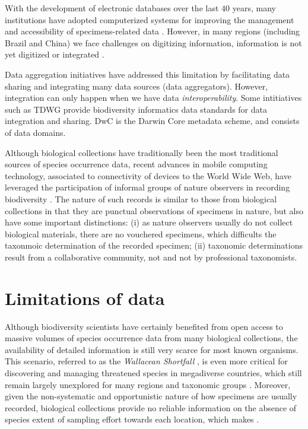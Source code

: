 With the development of electronic databases over the last $40$ years, many institutions have adopted computerized systems for improving the management and accessibility of specimens-related data \cite{Sunderland2013}.
However, in many regions (including Brazil and China) we face challenges on digitizing information, information is not yet digitized or integrated \cite{Meyer2016}.




Data aggregation initiatives have addressed this limitation by facilitating data sharing and integrating many data sources (data aggregators). %
However, integration can only happen when we have data \textit{interoperability}.
Some intitiatives such as TDWG provide biodiversity informatics data standards for data integration and sharing.
DwC is the Darwin Core metadata scheme, and consists of data domains. %


Although biological collections have traditionally been the most traditional sources of species occurrence data, recent advances in mobile computing technology, associated to connectivity of devices to the World Wide Web, have leveraged the participation of informal groups of nature observers in recording biodiversity \cite{Silvertown2009}.
The nature of such records is similar to those from biological collections in that they are punctual observations of specimens in nature, but also have some important distinctions: (i) as nature observers usually do not collect biological materials, there are no vouchered specimens, which difficults the taxonmoic determination of the recorded specimen; (ii) taxonomic determinations result from a collaborative community, not and not by professional taxonomists. 





\section{Limitations of data}

Although biodiversity scientists have certainly benefited from open access to massive volumes of species occurrence data from many biological collections, the availability of detailed information is still very scarce for most known organisms.
This scenario, referred to as the \textit{Wallacean Shortfall} \cite{Lomolino2004}, is even more critical for discovering and managing threatened species in megadiverse countries, which still remain largely unexplored for many regions and taxonomic groups \cite{Soberon2004}.
%
Moreover, given the non-systematic and opportunistic nature of how specimens are usually recorded, biological collections provide no reliable information on the absence of species extent of sampling effort towards each location, which makes .

